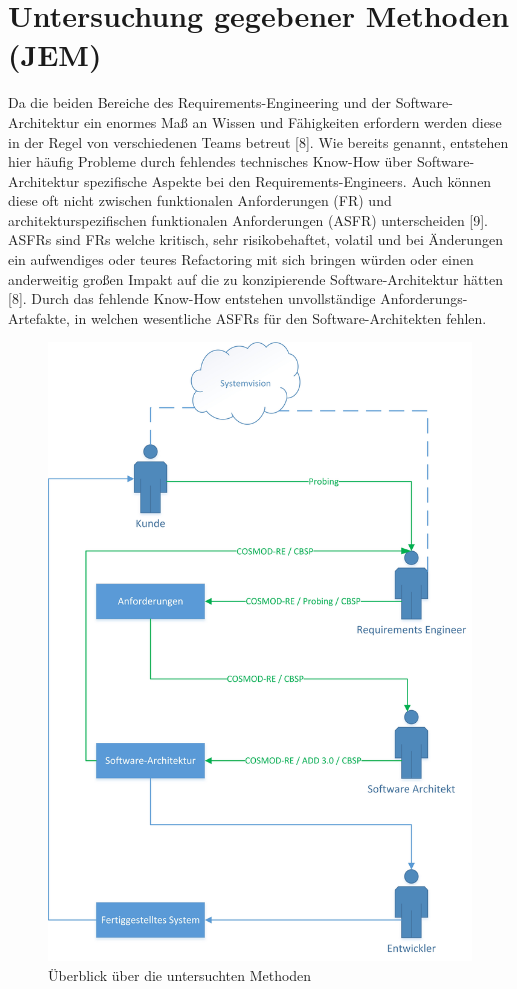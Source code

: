 \section{Untersuchung gegebener Methoden (JEM)}

Da die beiden Bereiche des Requirements-Engineering und der Software-Architektur ein enormes Maß an Wissen und Fähigkeiten erfordern werden diese in der Regel von verschiedenen Teams betreut [8]. Wie bereits genannt, entstehen hier häufig Probleme durch fehlendes technisches Know-How über Software-Architektur spezifische Aspekte bei den Requirements-Engineers. Auch können diese oft nicht zwischen funktionalen Anforderungen (FR) und architekturspezifischen funktionalen Anforderungen (ASFR) unterscheiden [9]. ASFRs sind FRs welche kritisch, sehr risikobehaftet, volatil und bei Änderungen ein aufwendiges oder teures Refactoring mit sich bringen würden oder einen anderweitig großen Impakt auf die zu konzipierende Software-Architektur hätten [8]. Durch das fehlende Know-How entstehen unvollständige Anforderungs-Artefakte, in welchen wesentliche ASFRs für den Software-Architekten fehlen. \\

\begin{figure}[h]
	\centering
	\includegraphics[scale=0.5]{methoden.jpg} 
	\caption{Überblick über die untersuchten Methoden}\label{methoden}
\end{figure}

